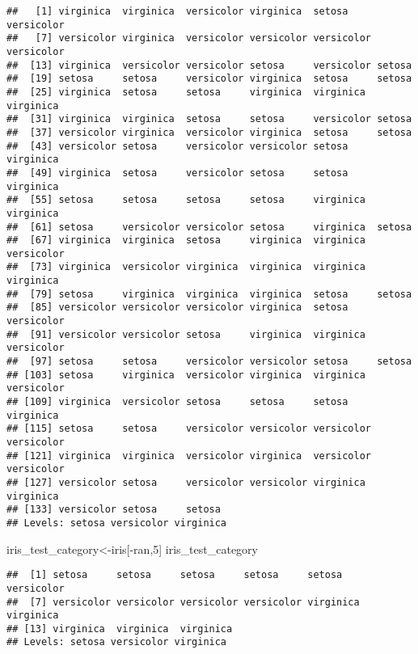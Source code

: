 \documentclass[
]{article}
\newenvironment{Shaded}{\begin{snugshade}}{\end{snugshade}}
\newcommand{\DecValTok}[1]{\textcolor[rgb]{0.00,0.00,0.81}{#1}}
\newcommand{\NormalTok}[1]{#1}
\newcommand{\OtherTok}[1]{\textcolor[rgb]{0.56,0.35,0.01}{#1}}
\newcommand{\SpecialCharTok}[1]{\textcolor[rgb]{0.00,0.00,0.00}{#1}}
\begin{document}
\begin{verbatim}
##   [1] virginica  virginica  versicolor virginica  setosa     versicolor
##   [7] versicolor virginica  versicolor versicolor versicolor versicolor
##  [13] virginica  versicolor versicolor setosa     versicolor setosa    
##  [19] setosa     setosa     versicolor virginica  setosa     setosa    
##  [25] virginica  setosa     setosa     virginica  virginica  virginica 
##  [31] virginica  virginica  setosa     setosa     versicolor setosa    
##  [37] versicolor virginica  versicolor virginica  setosa     setosa    
##  [43] versicolor setosa     versicolor versicolor setosa     virginica 
##  [49] virginica  setosa     versicolor setosa     setosa     virginica 
##  [55] setosa     setosa     setosa     setosa     virginica  virginica 
##  [61] setosa     versicolor versicolor setosa     virginica  setosa    
##  [67] virginica  virginica  setosa     virginica  virginica  versicolor
##  [73] virginica  versicolor virginica  virginica  virginica  virginica 
##  [79] setosa     virginica  virginica  virginica  setosa     setosa    
##  [85] versicolor versicolor versicolor virginica  setosa     versicolor
##  [91] versicolor versicolor setosa     virginica  virginica  versicolor
##  [97] setosa     setosa     versicolor versicolor setosa     setosa    
## [103] setosa     virginica  versicolor virginica  virginica  versicolor
## [109] virginica  versicolor setosa     setosa     setosa     virginica 
## [115] setosa     setosa     versicolor versicolor versicolor versicolor
## [121] virginica  virginica  versicolor virginica  versicolor versicolor
## [127] versicolor setosa     versicolor versicolor virginica  virginica 
## [133] versicolor setosa     setosa    
## Levels: setosa versicolor virginica
\end{verbatim}

\begin{Shaded}
\begin{Highlighting}[]
\NormalTok{iris\_test\_category}\OtherTok{\textless{}{-}}\NormalTok{iris[}\SpecialCharTok{{-}}\NormalTok{ran,}\DecValTok{5}\NormalTok{]}
\NormalTok{iris\_test\_category}
\end{Highlighting}
\end{Shaded}

\begin{verbatim}
##  [1] setosa     setosa     setosa     setosa     setosa     versicolor
##  [7] versicolor versicolor versicolor versicolor virginica  virginica 
## [13] virginica  virginica  virginica 
## Levels: setosa versicolor virginica
\end{verbatim}
\end{document}
